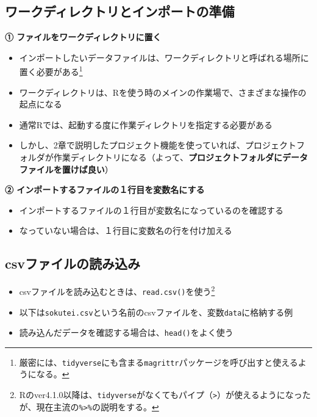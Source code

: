 \documentclass[
]{book}
\providecommand{\tightlist}{%
  \setlength{\itemsep}{0pt}\setlength{\parskip}{0pt}}
\begin{document}
\hypertarget{ux30efux30fcux30afux30c7ux30a3ux30ecux30afux30c8ux30eaux3068ux30a4ux30f3ux30ddux30fcux30c8ux306eux6e96ux5099}{%
\subsection{ワークディレクトリとインポートの準備}\label{ux30efux30fcux30afux30c7ux30a3ux30ecux30afux30c8ux30eaux3068ux30a4ux30f3ux30ddux30fcux30c8ux306eux6e96ux5099}}

\textbf{① ファイルをワークディレクトリに置く}

\begin{itemize}
\tightlist
\item
  インポートしたいデータファイルは、ワークディレクトリと呼ばれる場所に置く必要がある\footnote{厳密には、\texttt{tidyverse}にも含まる\texttt{magrittr}パッケージを呼び出すと使えるようになる。}
\item
  ワークディレクトリは、Rを使う時のメインの作業場で、さまざまな操作の起点になる
\item
  通常Rでは、起動する度に作業ディレクトリを指定する必要がある
\item
  しかし、2章で説明したプロジェクト機能を使っていれば、プロジェクトフォルダが作業ディレクトリになる（よって、\textbf{プロジェクトフォルダにデータファイルを置けば良い}）
\end{itemize}

\textbf{② インポートするファイルの１行目を変数名にする}

\begin{itemize}
\tightlist
\item
  インポートするファイルの１行目が変数名になっているのを確認する
\item
  なっていない場合は、１行目に変数名の行を付け加える
\end{itemize}

\hypertarget{csvux30d5ux30a1ux30a4ux30ebux306eux8aadux307fux8fbcux307f}{%
\subsection{csvファイルの読み込み}\label{csvux30d5ux30a1ux30a4ux30ebux306eux8aadux307fux8fbcux307f}}

\begin{itemize}
\tightlist
\item
  csvファイルを読み込むときは、\texttt{read.csv()}を使う\footnote{Rのver4.1.0以降は、\texttt{tidyverse}がなくてもパイプ（\texttt{\textbar{}\textgreater{}}）が使えるようになったが、現在主流の\texttt{\%\textgreater{}\%}の説明をする。}
\item
  以下は\texttt{sokutei.csv}という名前のcsvファイルを、変数\texttt{data}に格納する例
\item
  読み込んだデータを確認する場合は、\texttt{head()}をよく使う
\end{itemize}
\end{document}
